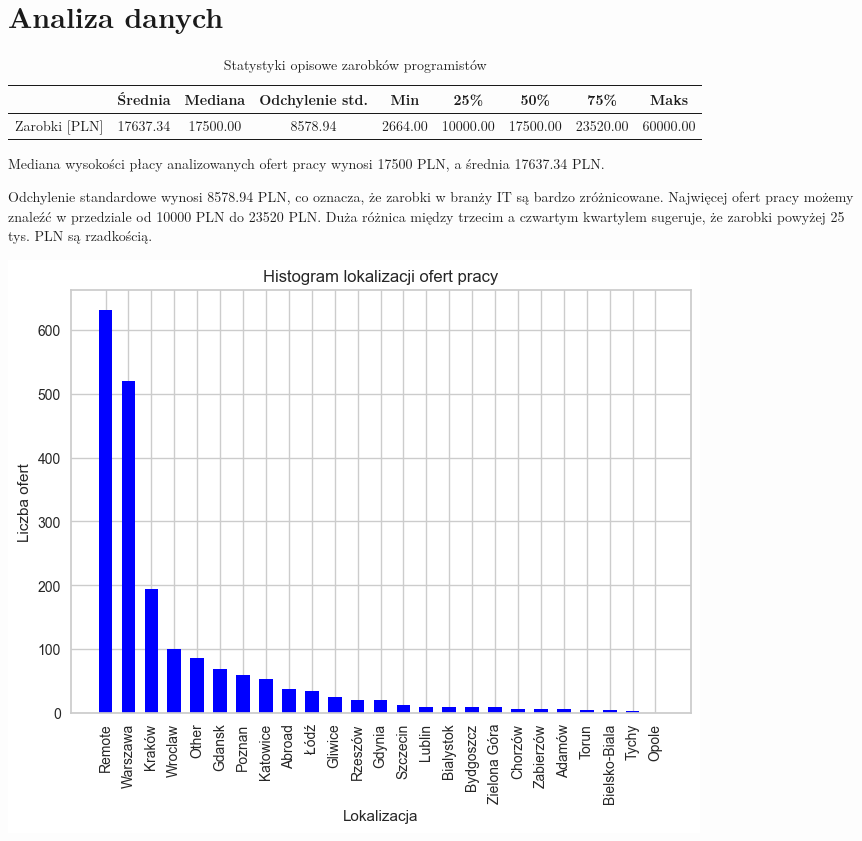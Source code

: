\documentclass{article}
\begin{document}
\section{Analiza danych}

\begin{table}[h!]
    \centering
    \begin{tabular}{|c|c|c|c|c|c|c|c|c|}
        \hline
                      & Średnia  & Mediana  & Odchylenie std. & Min     & 25\%     & 50\%     & 75\%     & Maks     \\
        \hline
        Zarobki [PLN] & 17637.34 & 17500.00 & 8578.94         & 2664.00 & 10000.00 & 17500.00 & 23520.00 & 60000.00 \\
        \hline
    \end{tabular}
    \caption{Statystyki opisowe zarobków programistów}
    \label{tab:zarobki}
\end{table}

Mediana wysokości płacy analizowanych ofert pracy wynosi 17500 PLN, a średnia 17637.34 PLN.

Odchylenie standardowe wynosi 8578.94 PLN, co oznacza, że zarobki w branży IT są bardzo zróżnicowane.
Najwięcej ofert pracy możemy znaleźć w przedziale od 10000 PLN do 23520 PLN.
Duża różnica między trzecim a czwartym kwartylem sugeruje, że zarobki powyżej 25 tys. PLN są rzadkością.

\begin{center}
    \includegraphics[scale=0.6]{img/location_hist.png}
\end{center}
\end{document}
